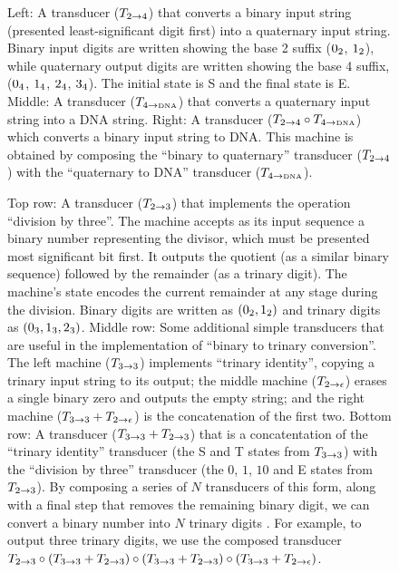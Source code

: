 \documentclass[english]{article}
\begin{document}
\newpage
\begin{figure}
\caption{
Left:
A transducer ($T_{2 \to 4}$) that converts a binary input string (presented least-significant digit first) into a quaternary input string.
Binary input digits are written showing the base 2 suffix ($0_2$, $1_2$),
while quaternary output digits are written showing the base 4 suffix, ($0_4$, $1_4$, $2_4$, $3_4$).
The initial state is S and the final state is E.
Middle:
A transducer ($T_{4 \to \mbox{\tiny DNA}}$) that converts a quaternary input string into a DNA string.
Right:
A transducer ($T_{2 \to 4} \circ T_{4 \to \mbox{\tiny DNA}}$)
which converts a binary input string to DNA.
This machine is obtained by composing the ``binary to quaternary'' transducer ($T_{2 \to 4}$) with the ``quaternary to DNA'' transducer ($T_{4 \to \mbox{\tiny DNA}}$).
}
\end{figure}

\newpage
\begin{figure}
\caption{
Top row:
A transducer ($T_{2 \to 3}$) that implements the operation ``division by three''.
The machine accepts as its input sequence a binary number representing the divisor, which must be presented most significant bit first.
It outputs the quotient (as a similar binary sequence) followed by the remainder (as a trinary digit).
The machine's state encodes the current remainder at any stage during the division.
Binary digits are written as $(0_2, 1_2)$
and trinary digits as $(0_3, 1_3, 2_3)$.
Middle row:
Some additional simple transducers that are useful in the implementation of ``binary to trinary conversion''.
The left machine ($T_{3 \to 3}$) implements ``trinary identity'', copying a trinary input string to its output;
the middle machine ($T_{2 \to \epsilon}$) erases a single binary zero and outputs the empty string;
and the right machine ($T_{3 \to 3} + T_{2 \to \epsilon}$) is the concatenation of the first two.
Bottom row:
A transducer ($T_{3 \to 3} + T_{2 \to 3}$)
that is a concatentation of the ``trinary identity'' transducer (the S and T states from $T_{3 \to 3}$)
with the ``division by three'' transducer (the $0$, $1$, $10$ and E states from $T_{2 \to 3}$).
By composing a series of $N$ transducers of this form, along with a final step that removes the remaining binary digit,
we can convert a binary number into $N$ trinary digits \cite{MartinsFerreira2012}.
For example, to output three trinary digits, we use the composed transducer
$ T_{2 \to 3} \circ (T_{3 \to 3} + T_{2 \to 3}) \circ (T_{3 \to 3} + T_{2 \to 3}) \circ (T_{3 \to 3} + T_{2 \to \epsilon})$.
}
\end{figure}
\end{document}
